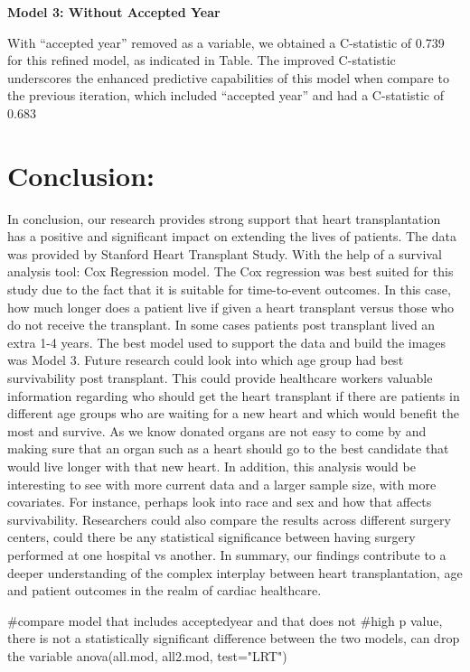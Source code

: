 \documentclass[
  letterpaper,
  DIV=11,
  numbers=noendperiod]{scrreprt}
\newenvironment{Shaded}{\begin{snugshade}}{\end{snugshade}}
\newcommand{\AttributeTok}[1]{\textcolor[rgb]{0.40,0.45,0.13}{#1}}
\newcommand{\CommentTok}[1]{\textcolor[rgb]{0.37,0.37,0.37}{#1}}
\newcommand{\FunctionTok}[1]{\textcolor[rgb]{0.28,0.35,0.67}{#1}}
\newcommand{\NormalTok}[1]{\textcolor[rgb]{0.00,0.23,0.31}{#1}}
\newcommand{\StringTok}[1]{\textcolor[rgb]{0.13,0.47,0.30}{#1}}
\begin{document}
\textbf{Model 3: Without Accepted Year}

With ``accepted year'' removed as a variable, we obtained a C-statistic
of 0.739 for this refined model, as indicated in Table. The improved
C-statistic underscores the enhanced predictive capabilities of this
model when compare to the previous iteration, which included ``accepted
year'' and had a C-statistic of 0.683

\hypertarget{conclusion}{%
\section{Conclusion:}\label{conclusion}}

In conclusion, our research provides strong support that heart
transplantation has a positive and significant impact on extending the
lives of patients. The data was provided by Stanford Heart Transplant
Study. With the help of a survival analysis tool: Cox Regression model.
The Cox regression was best suited for this study due to the fact that
it is suitable for time-to-event outcomes. In this case, how much longer
does a patient live if given a heart transplant versus those who do not
receive the transplant. In some cases patients post transplant lived an
extra 1-4 years. The best model used to support the data and build the
images was Model 3. Future research could look into which age group had
best survivability post transplant. This could provide healthcare
workers valuable information regarding who should get the heart
transplant if there are patients in different age groups who are waiting
for a new heart and which would benefit the most and survive. As we know
donated organs are not easy to come by and making sure that an organ
such as a heart should go to the best candidate that would live longer
with that new heart. In addition, this analysis would be interesting to
see with more current data and a larger sample size, with more
covariates. For instance, perhaps look into race and sex and how that
affects survivability. Researchers could also compare the results across
different surgery centers, could there be any statistical significance
between having surgery performed at one hospital vs another. In summary,
our findings contribute to a deeper understanding of the complex
interplay between heart transplantation, age and patient outcomes in the
realm of cardiac healthcare.

\begin{Shaded}
\begin{Highlighting}[]
\CommentTok{\#compare model that includes acceptedyear and that does not}
\CommentTok{\#high p value, there is not a statistically significant difference between the two models, can drop the variable}
\FunctionTok{anova}\NormalTok{(all.mod, all2.mod, }\AttributeTok{test=}\StringTok{"LRT"}\NormalTok{)}
\end{Highlighting}
\end{Shaded}
\end{document}
